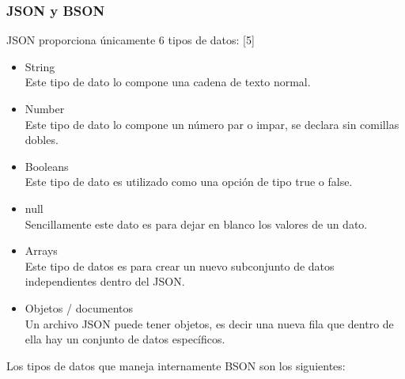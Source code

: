 \documentclass[twocolumn]{article}
\begin{document}
\subsubsection{JSON y BSON}

JSON proporciona únicamente 6 tipos de datos: [5]

\begin{itemize}
  \item String
    \\ Este tipo de dato lo compone una cadena de texto normal.
  \item Number
    \\Este tipo de dato lo compone un número par o impar, se declara sin comillas dobles.
  \item Booleans
    \\Este tipo de dato es utilizado como una opción de tipo true o false.
  \item null
    \\Sencillamente este dato es para dejar en blanco los valores de un dato.
  \item Arrays
      \\Este tipo de datos es para crear un nuevo subconjunto de datos independientes dentro del JSON.  
  \item Objetos / documentos
      \\Un archivo JSON puede tener objetos, es decir una nueva fila que dentro de ella hay un conjunto de datos específicos.
\end{itemize}

Los tipos de datos que maneja internamente BSON son los siguientes:
\end{document}
